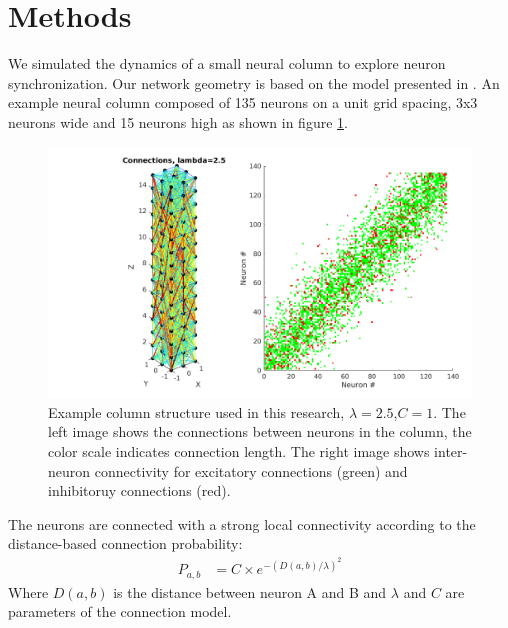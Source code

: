 \documentclass[a4paper,11pt]{article}
\begin{document}
\section{Methods}
We simulated the dynamics of a small neural column to explore neuron synchronization.
Our network geometry is based on the model presented in \cite{markram1998}.
An example neural column composed of 135 neurons on a unit grid spacing, 3x3 neurons wide and 15 neurons high as shown in figure \ref{fig:column_structure}.
\begin{figure}[!htb]
 \caption{Example column structure used in this research, $\lambda=2.5$,$C=1$. The left image shows the connections between neurons in the column, the color scale indicates connection length. The right image shows inter-neuron connectivity for excitatory connections (green) and inhibitoruy connections (red).}
 \label{fig:column_structure}
 \centering
   \includegraphics[width=\textwidth]{fig/lambda2}
\end{figure}
The neurons are connected with a strong local connectivity according to the distance-based connection probability:
\begin{align}\label{eq:connectivity}
 P_{a,b} &= C \times e^{-(D(a,b)/\lambda)^2}
\end{align}
Where $D(a,b)$ is the distance between neuron A and B and $\lambda$ and $C$ are parameters of the connection model.
\end{document}
